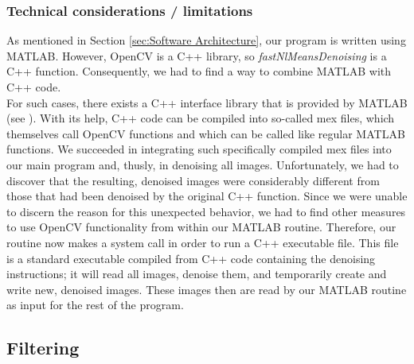 \documentclass{article}
\begin{document}
\subsubsection{Technical considerations / limitations}
As mentioned in Section \ref{sec:Software Architecture}, our program is written using MATLAB. However, OpenCV is a C++ library, so \textit{fastNlMeansDenoising} is a C++ function. Consequently, we had to find a way to combine MATLAB with C++ code. \\
For such cases, there exists a C++ interface library that is provided by MATLAB (see \cite{opencvInterfaceSupport}). With its help, C++ code can be compiled into so-called mex files, which themselves call OpenCV functions and which can be called like regular MATLAB functions. We succeeded in integrating such specifically compiled mex files into our main program and, thusly, in denoising all images. Unfortunately, we had to discover that the resulting, denoised images were considerably different from those that had been denoised by the original C++ function. Since we were unable to discern the reason for this unexpected behavior, we had to find other measures to use OpenCV functionality from within our MATLAB routine. Therefore, our routine now makes a system call in order to run a C++ executable file. This file is a standard executable compiled from C++ code containing the denoising instructions; it will read all images, denoise them, and temporarily create and write new, denoised images. These images then are read by our MATLAB routine as input for the rest of the program.

\newpage
\subsection{Filtering}\label{sec:Filtering}
\end{document}
